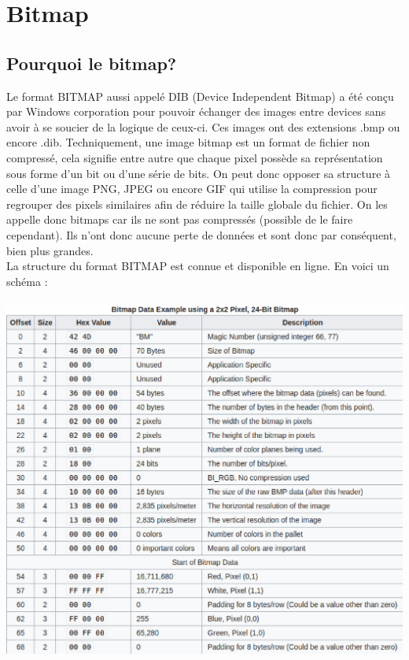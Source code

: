 \section{Bitmap}

\subsection{Pourquoi le bitmap?}
Le format BITMAP aussi appelé DIB (Device Independent Bitmap) a été conçu par Windows corporation pour pouvoir échanger des images entre devices sans avoir à se soucier de la logique de ceux-ci.
Ces images ont des extensions .bmp ou encore .dib.
Techniquement, une image bitmap est un format de fichier non compressé, cela signifie entre autre que chaque pixel possède sa représentation sous forme d'un bit ou d'une série de bits.
On peut donc opposer sa structure à celle d'une image PNG, JPEG ou encore GIF qui utilise la compression pour regrouper des pixels similaires afin de réduire la taille globale du fichier.
On les appelle donc bitmaps car ils ne sont pas compressés (possible de le faire cependant).
Ils n'ont donc aucune perte de données et sont donc par conséquent, bien plus grandes.\\

La structure du format BITMAP est connue et disponible en ligne. En voici un schéma : \\\\

\includegraphics[width=15cm]{bitmap_structure.eps}\\\\

